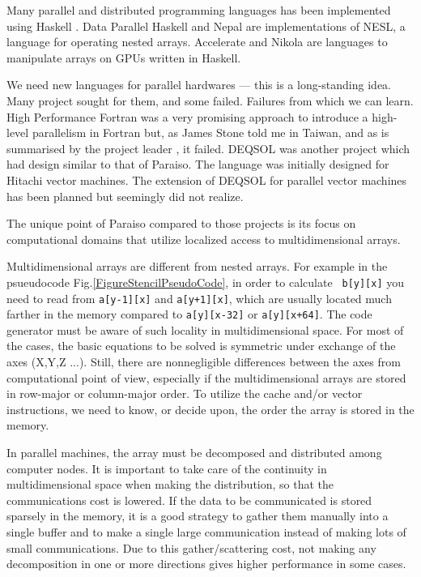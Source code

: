 \documentclass[twocolumn]{article}
\begin{document}
Many parallel and distributed programming languages has been implemented using
Haskell \cite{CambridgeJournals:114967}. Data Parallel Haskell
\cite{nested-data-parallelism} and
Nepal\cite{springerlink:10.10073-540-44681-8_76} are implementations of NESL,
a language for operating nested arrays.
Accelerate \cite{Chakravarty:2011:AHA:1926354.1926358} and
Nikola \cite{Mainland:2010:NEC:1863523.1863533} are languages to manipulate arrays on GPUs written in Haskell.

We need new languages for parallel hardwares --- this is a long-standing
idea. Many project sought for them, and some failed. Failures from which we
can learn. High Performance Fortran was a very promising approach to introduce
a high-level parallelism in Fortran but, as James Stone told me in Taiwan, and
as is summarised by the project leader
\cite{Kennedy:2007:RFH:1238844.1238851}, it failed.  DEQSOL
\cite{SAGAWANOBUTOSHI:1989-01-15,Kon'no:1986:AIS:324493.325029} was another
project which had design similar to that of Paraiso. The language was
initially designed for Hitachi vector machines. The extension of DEQSOL for
parallel vector machines has been planned \cite{SagawaNobutoshi:1989-03-15}
but seemingly did not realize.

The unique point of Paraiso compared to those projects is its focus on
computational domains that utilize localized access to multidimensional
arrays.

Multidimensional arrays are different from nested arrays. For example in the
psueudocode Fig.\ref{FigureStencilPseudoCode}, in order to calculate {\tt
  b[y][x]} you need to read from {\tt a[y-1][x]} and {\tt a[y+1][x]}, which
are usually located much farther in the memory compared to {\tt a[y][x-32]} or
{\tt a[y][x+64]}. The code generator must be aware of such locality in
multidimensional space.  For most of the cases, the basic equations to be
solved is symmetric under exchange of the axes (X,Y,Z ...). Still, there are
nonnegligible differences between the axes from computational point of view,
especially if the multidimensional arrays are stored in row-major or
column-major order. To utilize the cache and/or vector instructions, we need
to know, or decide upon, the order the array is stored in the memory.

In parallel machines, the array must be decomposed and distributed among
computer nodes. It is important to take care of the continuity in
multidimensional space when making the distribution, so that the
communications cost is lowered. If the data to be communicated is stored
sparsely in the memory, it is a good strategy to gather them manually into a
single buffer and to make a single large communication instead of making lots
of small communications. Due to this gather/scattering cost, not making any
decomposition in one or more directions gives higher performance in some
cases.
\end{document}
